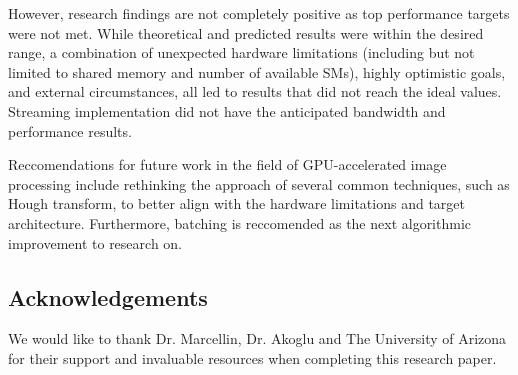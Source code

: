 \documentclass[12pt]{article}
\begin{document}
However, research findings are not completely positive as top performance targets were not met. While theoretical and predicted results were within the desired range, a combination of unexpected hardware limitations (including but not limited to shared memory and number of available SMs), highly optimistic goals, and external circumstances, all led to results that did not reach the ideal values. Streaming implementation did not have the anticipated bandwidth and performance results.

Reccomendations for future work in the field of GPU-accelerated image processing include rethinking the approach of several common techniques, such as Hough transform, to better align with the hardware limitations and target architecture. Furthermore, batching is reccomended as the next algorithmic improvement to research on.

\subsection{Acknowledgements}

We would like to thank Dr. Marcellin, Dr. Akoglu and The University of Arizona for their support and invaluable resources when completing this research paper.



\end{document}
